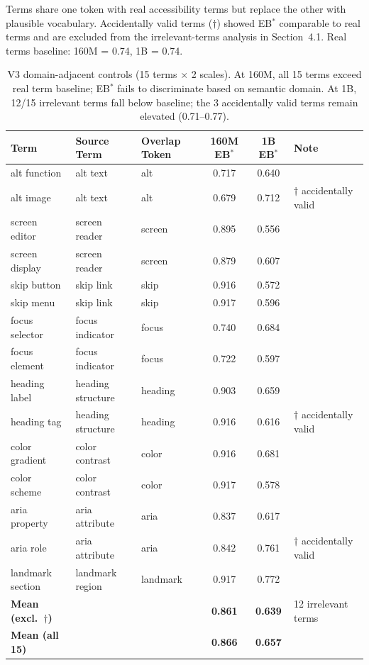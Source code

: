 \documentclass[10pt]{article} %
\begin{document}
Terms share one token with real accessibility terms but replace the other with plausible vocabulary.
Accidentally valid terms ($\dagger$) showed EB$^*$ comparable to real terms and are excluded from the irrelevant-terms analysis in Section~4.1.
Real terms baseline: 160M = 0.74, 1B = 0.74.

\begin{table}[H]
\centering
\small
\begin{tabular}{|l|l|l|c|c|l|}
\hline
\textbf{Term} & \textbf{Source Term} & \textbf{Overlap Token} & \textbf{160M EB$^*$} & \textbf{1B EB$^*$} & \textbf{Note} \\
\hline
alt function & alt text & alt & 0.717 & 0.640 & \\
alt image & alt text & alt & 0.679 & 0.712 & $\dagger$ accidentally valid \\
screen editor & screen reader & screen & 0.895 & 0.556 & \\
screen display & screen reader & screen & 0.879 & 0.607 & \\
skip button & skip link & skip & 0.916 & 0.572 & \\
skip menu & skip link & skip & 0.917 & 0.596 & \\
focus selector & focus indicator & focus & 0.740 & 0.684 & \\
focus element & focus indicator & focus & 0.722 & 0.597 & \\
heading label & heading structure & heading & 0.903 & 0.659 & \\
heading tag & heading structure & heading & 0.916 & 0.616 & $\dagger$ accidentally valid \\
color gradient & color contrast & color & 0.916 & 0.681 & \\
color scheme & color contrast & color & 0.917 & 0.578 & \\
aria property & aria attribute & aria & 0.837 & 0.617 & \\
aria role & aria attribute & aria & 0.842 & 0.761 & $\dagger$ accidentally valid \\
landmark section & landmark region & landmark & 0.917 & 0.772 & \\
\hline
\textbf{Mean (excl.\ $\dagger$)} & & & \textbf{0.861} & \textbf{0.639} & 12 irrelevant terms \\
\textbf{Mean (all 15)} & & & \textbf{0.866} & \textbf{0.657} & \\
\hline
\end{tabular}
\caption{V3 domain-adjacent controls (15 terms $\times$ 2 scales). At 160M, all 15 terms exceed real term baseline; EB$^*$ fails to discriminate based on semantic domain. At 1B, 12/15 irrelevant terms fall below baseline; the 3 accidentally valid terms remain elevated (0.71--0.77).}
\end{table}
\end{document}
